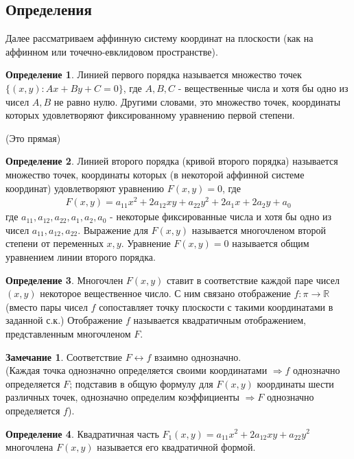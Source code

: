 \documentclass[a4paper, 12pt]{article}
\theoremstyle{definition}
\newtheorem*{definition}{Определение}
\newtheorem*{remark}{Замечание}
\begin{document}
	\subsection{Определения}
	Далее рассматриваем аффинную систему координат на плоскости (как на аффинном или точечно-евклидовом пространстве).
	\begin{definition}
		Линией первого порядка называется множество точек $\{(x, y): Ax + By + C =0\}$, где $A, B, C$ - вещественные числа и хотя бы одно из чисел $A, B$ не равно нулю. Другими словами, это множество точек, координаты которых удовлетворяют фиксированному уравнению первой степени.
	\end{definition}
	(Это прямая)
	\begin{definition}
		Линией второго порядка (кривой второго порядка) называется множество точек, координаты которых (в некоторой аффинной системе координат) удовлетворяют уравнению $F(x, y) = 0$, где \begin{align*}
			F(x, y) = a_{11}x^2 + 2a_{12}xy + a_{22}y^2 + 2a_{1}x + 2a_{2}y + a_{0}
		\end{align*}
		где $a_{11}, a_{12}, a_{22} , a_1, a_2, a_0$ - некоторые фиксированные числа и хотя бы одно из чисел $a_11, a_12, a_22$. Выражение для $F(x, y)$ называется многочленом второй степени от переменных $x, y$. Уравнение $F(x, y) = 0$ называется общим уравнением линии второго порядка.
	\end{definition}
	\begin{definition}
		Многочлен $F(x, y)$ ставит в соответствие каждой паре чисел $(x, y)$ некоторое вещественное число. С ним связано отображение $f: \pi \rightarrow \mathbb{R}$ (вместо пары чисел $f$ сопоставляет точку плоскости с такими координатами в заданной с.к.) Отображение $f$ называется квадратичным отображением, представленным многочленом $F$.
	\end{definition}
	\begin{remark}
		Соответствие $F \leftrightarrow f$ взаимно однозначно.\\
		(Каждая точка однозначно определяется своими координатами $\Rightarrow f$ однозначно определяется $F$; подставив в общую формулу для $F(x, y)$ координаты шести различных точек, однозначно определим коэффициенты $\Rightarrow F$ однозначно определяется $f$).
	\end{remark}
	\begin{definition}
		Квадратичная часть $F_1(x, y) = a_{11}x^2 + 2a_{12}xy + a_{22}y^2$ многочлена $F(x, y)$ называется его квадратичной формой.
	\end{definition}
\end{document}
